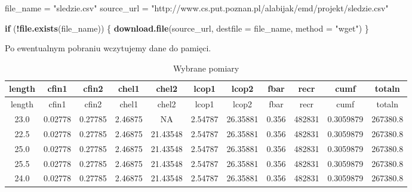 \documentclass[]{article}
\newenvironment{Shaded}{\begin{snugshade}}{\end{snugshade}}
\newcommand{\ControlFlowTok}[1]{\textcolor[rgb]{0.13,0.29,0.53}{\textbf{#1}}}
\newcommand{\DataTypeTok}[1]{\textcolor[rgb]{0.13,0.29,0.53}{#1}}
\newcommand{\DecValTok}[1]{\textcolor[rgb]{0.00,0.00,0.81}{#1}}
\newcommand{\KeywordTok}[1]{\textcolor[rgb]{0.13,0.29,0.53}{\textbf{#1}}}
\newcommand{\NormalTok}[1]{#1}
\newcommand{\OperatorTok}[1]{\textcolor[rgb]{0.81,0.36,0.00}{\textbf{#1}}}
\newcommand{\OtherTok}[1]{\textcolor[rgb]{0.56,0.35,0.01}{#1}}
\newcommand{\StringTok}[1]{\textcolor[rgb]{0.31,0.60,0.02}{#1}}
\begin{document}
\begin{Shaded}
\begin{Highlighting}[]
\NormalTok{file_name =}\StringTok{ "sledzie.csv"}
\NormalTok{source_url =}\StringTok{ "http://www.cs.put.poznan.pl/alabijak/emd/projekt/sledzie.csv"}

\ControlFlowTok{if}\NormalTok{ (}\OperatorTok{!}\KeywordTok{file.exists}\NormalTok{(file_name)) \{}
  \KeywordTok{download.file}\NormalTok{(source_url, }\DataTypeTok{destfile =}\NormalTok{ file_name, }\DataTypeTok{method =} \StringTok{"wget"}\NormalTok{)}
\NormalTok{\}}
\end{Highlighting}
\end{Shaded}

Po ewentualnym pobraniu wczytujemy dane do pamięci.

\begin{Shaded}
\end{Shaded}

\begin{longtable}[]{@{}ccccccccccc@{}}
\caption{Wybrane pomiary}\tabularnewline
\toprule
length & cfin1 & cfin2 & chel1 & chel2 & lcop1 & lcop2 & fbar & recr &
cumf & totaln\tabularnewline
\midrule
\endfirsthead
\toprule
length & cfin1 & cfin2 & chel1 & chel2 & lcop1 & lcop2 & fbar & recr &
cumf & totaln\tabularnewline
\midrule
\endhead
23.0 & 0.02778 & 0.27785 & 2.46875 & NA & 2.54787 & 26.35881 & 0.356 &
482831 & 0.3059879 & 267380.8\tabularnewline
22.5 & 0.02778 & 0.27785 & 2.46875 & 21.43548 & 2.54787 & 26.35881 &
0.356 & 482831 & 0.3059879 & 267380.8\tabularnewline
25.0 & 0.02778 & 0.27785 & 2.46875 & 21.43548 & 2.54787 & 26.35881 &
0.356 & 482831 & 0.3059879 & 267380.8\tabularnewline
25.5 & 0.02778 & 0.27785 & 2.46875 & 21.43548 & 2.54787 & 26.35881 &
0.356 & 482831 & 0.3059879 & 267380.8\tabularnewline
24.0 & 0.02778 & 0.27785 & 2.46875 & 21.43548 & 2.54787 & 26.35881 &
0.356 & 482831 & 0.3059879 & 267380.8\tabularnewline
\bottomrule
\end{longtable}
\end{document}
